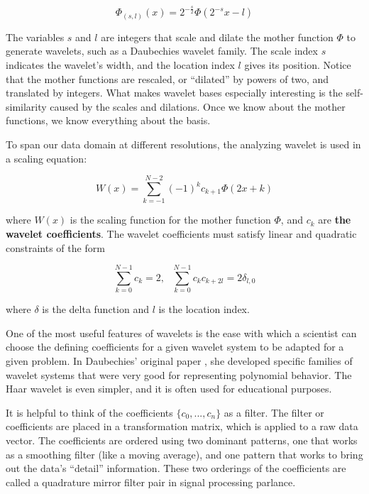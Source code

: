 \documentclass{article}
\begin{document}
\begin{equation}
\Phi_{(s,l)} (x) = 2^{-\frac{s}{2}} \Phi(2^{-s} x-l)
\label{eq:mother-function}
\end{equation}

The variables $s$ and $l$ are integers that scale and dilate the mother function $\Phi$ to generate
wavelets, such as a Daubechies wavelet family. The scale index $s$ indicates the wavelet’s width, and
the location index $l$ gives its position. Notice that the mother functions are rescaled, or “dilated”
by powers of two, and translated by integers. What makes wavelet bases especially interesting is
the self-similarity caused by the scales and dilations. Once we know about the mother functions, we
know everything about the basis.

To span our data domain at different resolutions, the analyzing wavelet is used in a scaling
equation:

\begin{equation}
W(x) = \sum_{k=-1}^{N - 2} (-1)^{k}c_{k+1}\Phi(2x + k)
\label{eq:scaling-equation}
\end{equation}

where $W(x)$ is the scaling function for the mother function $\Phi$, and $c_k$ are \textbf{the wavelet coefficients}.
The wavelet coefficients must satisfy linear and quadratic constraints of the form

\begin{equation}
\sum_{k=0}^{N-1} c_k = 2,\ \ \ \sum_{k=0}^{N-1} c_k c_{k+2l} = 2\delta_{l,0}
\label{eq:wavelet-coefficients}
\end{equation}

where $\delta$ is the delta function and $l$ is the location index.

One of the most useful features of wavelets is the ease with which a scientist can choose the
defining coefficients for a given wavelet system to be adapted for a given problem. In Daubechies’
original paper \cite{daubechies1988orthonormal}, she developed specific families of wavelet systems that were very good for representing polynomial behavior. The Haar wavelet is even simpler, and it is often used for educational
purposes.

It is helpful to think of the coefficients $\{c_0,...,c_n\}$ as a filter. The filter or coefficients are placed
in a transformation matrix, which is applied to a raw data vector. The coefficients are ordered using
two dominant patterns, one that works as a smoothing filter (like a moving average), and one pattern
that works to bring out the data’s “detail” information. These two orderings of the coefficients are
called a quadrature mirror filter pair in signal processing parlance.
\end{document}
